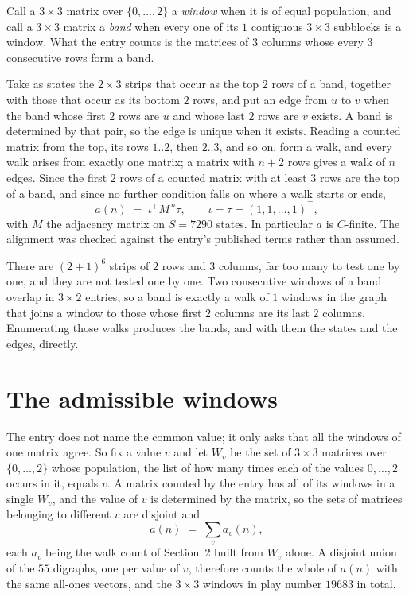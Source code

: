 \documentclass[11pt,a4paper]{article}
\theoremstyle{plain}
\theoremstyle{definition}
\begin{document}
Call a $3\times3$ matrix over $\{0,\dots,2\}$ a \emph{window} when it is of equal population, and
call a $3\times3$ matrix a \emph{band} when every one of its $1$ contiguous
$3\times3$ subblocks is a window. What the entry counts is the matrices of $3$ columns
whose every $3$ consecutive rows form a band.

Take as states the $2\times3$ strips that occur as the top $2$ rows of a band,
together with those that occur as its bottom $2$ rows, and put an edge from $u$ to $v$
when the band whose first $2$ rows are $u$ and whose last $2$ rows are $v$ exists.
A band is determined by that pair, so the edge is unique when it exists. Reading a counted
matrix from the top, its rows $1..2$, then $2..3$, and so on, form a walk, and every
walk arises from exactly one matrix; a matrix with $n+2$ rows gives a walk of $n$ edges.
Since the first $2$ rows of a counted matrix with at least $3$ rows are the top of a
band, and since no further condition falls on where a walk starts or ends,
\[
a(n)\;=\;\iota^{\!\top}M^{\,n}\tau ,\qquad \iota=\tau=(1,1,\dots,1)^{\!\top},
\]
with $M$ the adjacency matrix on $S=7290$ states. In particular $a$ is $C$-finite. The
alignment was checked against the entry's published terms rather than assumed.

There are $(2 + 1)^{6}$ strips of $2$ rows and $3$ columns, far too
many to test one by one, and they are not tested one by one. Two consecutive windows of a band
overlap in $3\times2$ entries, so a band is exactly a walk of $1$ windows in
the graph that joins a window to those whose first $2$ columns are its last $2$
columns. Enumerating those walks produces the bands, and with them the states and the edges,
directly.

\section{The admissible windows}

The entry does not name the common value; it only asks that all the windows of one matrix agree.
So fix a value $v$ and let $W_v$ be the set of $3\times3$ matrices over
$\{0,\dots,2\}$ whose population, the list of how many times each of the values $0,\dots,2$ occurs in it, equals $v$. A matrix counted by the entry has all of
its windows in a single $W_v$, and the value of $v$ is determined by the matrix, so the sets of
matrices belonging to different $v$ are disjoint and
\[
a(n)\;=\;\sum_v a_v(n),
\]
each $a_v$ being the walk count of Section~2 built from $W_v$ alone. A disjoint union of the
$55$ digraphs, one per value of $v$, therefore counts the whole of $a(n)$ with the same
all-ones vectors, and the $3\times3$ windows in play number $19683$ in total.
\end{document}
